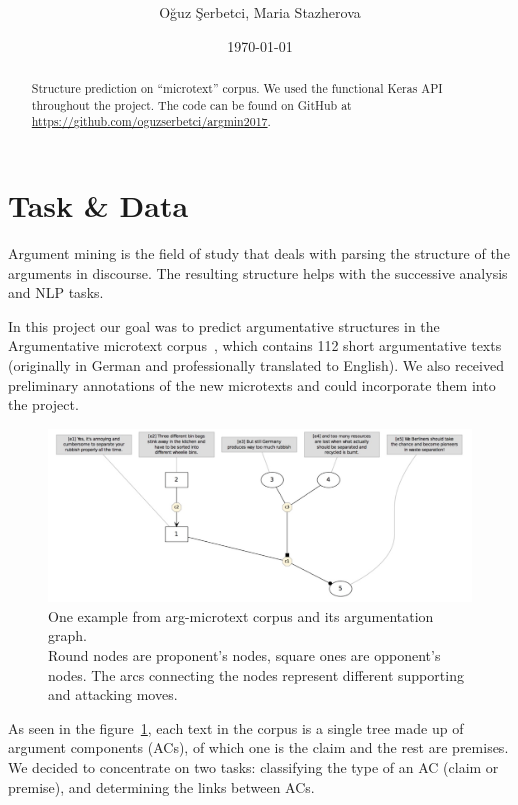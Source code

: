 \documentclass[onecolumn]{article}
\title{\spacecaps{Project module report: Argumentation Mining }\\
       \normalsize\spacesc{University of Potsdam, Winter semester 2017/18}}
\author{O\u{g}uz \c{S}erbetci, Maria Stazherova}
\date{\today}
\begin{document}
\maketitle

\begin{abstract}

Structure prediction on ``microtext'' corpus. We used the functional Keras API throughout the project. The code can be found on GitHub at \url{https://github.com/oguzserbetci/argmin2017}.

\end{abstract}


\section{Task \& Data}
Argument mining is the field of study that deals with parsing the structure of the arguments in discourse. The resulting structure helps with the successive analysis and NLP tasks.

In this project our goal was to predict argumentative structures in the
Argumentative microtext corpus~\cite{peldszus2015annotated}, which contains 112 short argumentative texts
(originally in German and professionally translated to English).
We also received preliminary annotations of the new microtexts
and could incorporate them into the project.

\begin{figure}[h]
    \centering
    \includegraphics[width=0.8\linewidth]{fig/microtext.jpg}
    \caption{One example from arg-microtext corpus and its argumentation graph.
            \\Round nodes are proponent's nodes, square ones are opponent's nodes.
            The arcs connecting the nodes represent different supporting and attacking moves.}\label{fig:microtext}
\end{figure}

As seen in the figure~\ref{fig:microtext}, each text in the corpus is a single tree made up of argument components (ACs), of which one is the claim and the rest are premises.
We decided to concentrate on two tasks: classifying the type of an AC (claim or premise), and determining the links between ACs.
\end{document}
